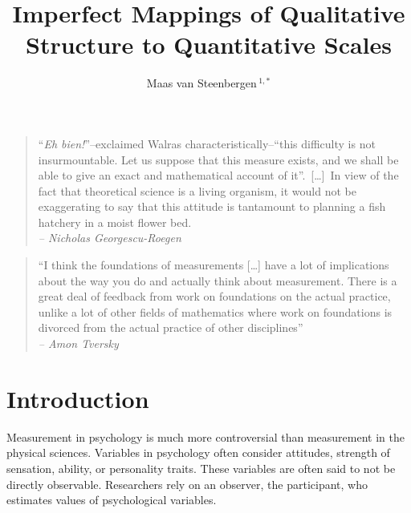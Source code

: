 \documentclass[utf8]{FrontiersinVancouver}
\def\firstAuthorLast{van Steenbergen} %
\def\Authors{Maas van Steenbergen\,$^{1,*}$}
\begin{document}
\onecolumn
{}

\title[]{Imperfect Mappings of Qualitative Structure to Quantitative Scales} 

\author[\firstAuthorLast]{\Authors} %
\address{} %
\correspondance{} %

\extraAuth{}%

\maketitle


\begin{quote}
    ``\textit{Eh bien!}''--exclaimed Walras characteristically--``this difficulty is not insurmountable. Let us suppose that this measure exists, and we shall be able to give an exact and mathematical account of it''.\ 
    [\dots]\ In view of the fact that theoretical science is a living organism, it would not be exaggerating to say that this attitude is tantamount to planning a fish hatchery in a moist flower bed.\\
    \textit{-- Nicholas Georgescu-Roegen}

\end{quote}
\begin{quote}
    ``I think the foundations of measurements [\ldots] have a lot of implications about the way you do and actually think about measurement. There is a great deal of feedback from work on foundations on the actual practice, unlike a lot of other fields of mathematics where work on foundations is divorced from the actual practice of other disciplines''\\
    \textit{-- Amon Tversky}
\end{quote}
\section{Introduction}
Measurement in psychology is much more controversial than measurement in the physical sciences.  Variables in psychology often consider attitudes, strength of sensation, ability, or personality traits. These variables are often said to not be directly observable. Researchers rely on an observer, the participant, who estimates values of psychological variables. 
\end{document}
